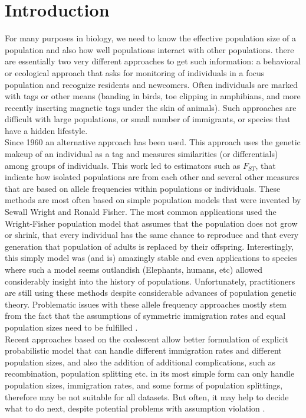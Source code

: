 \chapter{Introduction}

For many purposes in biology, we need to know the effective population size of a population and also how well populations interact with other populations. there are essentially two very different approaches to get such information: a behavioral or ecological approach that asks for monitoring of individuals in a focus population and recognize residents and newcomers. Often individuals are marked with tags or other means (banding in birds, toe clipping in amphibians, and more recently inserting magnetic tags under the skin of animals). Such approaches are difficult with large populations, or small number of immigrants, or species that have a hidden lifestyle. \\

Since 1960 an alternative approach has been used. This approach uses the genetic makeup of an individual as a tag and measures similarities (or differentials) among groups of individuals. This work led to estimators such as $F_{ST}$, that indicate how isolated populations are from each other and several other measures that are based on allele frequencies within populations or individuals. These methods are most often based on simple population models that were invented by Sewall Wright and Ronald Fisher. The most common applications used the Wright-Fisher population model that assumes that the population does not grow or shrink, that every individual has the same chance to reproduce and that every generation that population of adults is replaced by their offspring. Interestingly, this simply model was (and is) amazingly stable and even applications to species where such a model seems outlandish (Elephants, humans, etc) allowed considerably insight into the history of populations. Unfortunately, practitioners are still using these methods despite considerable advances of population genetic theory. Problematic issues with these allele frequency approaches mostly stem from the fact that the assumptions of symmetric immigration rates and equal population sizes need to be fulfilled \citep{beerli:2004:EUP}.\\

Recent approaches based on the coalescent \citep{kingman:2000:oc} allow better formulation of explicit probabilistic model that can handle different immigration rates and different population sizes, and also the addition of additional complications, such as recombination, population splitting etc.
\migrate in its most simple form can only handle population sizes, immigration rates, and some forms of population splittings, therefore may be not suitable for all datasets. But often, it may help to decide what to do next, despite potential problems with assumption violation \citep{beerli:2009:wid}. \\

